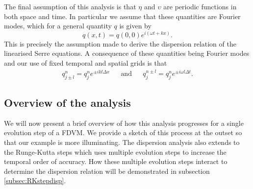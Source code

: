 The final assumption of this analysis is that $\eta$ and $\upsilon$ are periodic functions in both space and time. In particular we assume that these quantities are Fourier modes, which for a general quantity $q$ is given by
\begin{equation}
q(x,t) = q(0,0) e^{i\left(\omega t + kx\right)}.
\label{eqn:FourierNode}
\end{equation}
This is precisely the assumption made to derive the dispersion relation of the linearised Serre equations. A consequence of these quantities being Fourier modes and our use of fixed temporal and spatial grids is that
\begin{align}
q^{n}_{j \pm l} = q^n_j e^{\pm ik l\Delta x} & & \text{and} & & q^{n \pm l}_{j} = q^n_j e^{\pm i \omega l\Delta t}.
\label{eqn:fourierfactor}
\end{align}



\subsection{Overview of the analysis}
We will now present a brief overview of how this analysis progresses for a single evolution step of a FDVM. We provide a sketch of this process at the outset so that our example is more illuminating. The dispersion analysis also extends to the Runge-Kutta steps which uses multiple evolution steps to increase the temporal order of accuracy. How these multiple evolution steps interact to determine the dispersion relation will be demonstrated in subsection \ref{subsec:RKstepdisp}.

